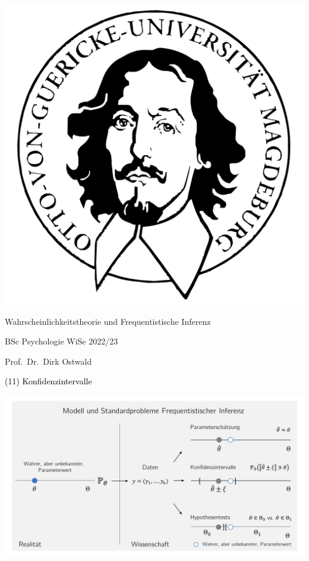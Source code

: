 \documentclass[
  8pt,
  ignorenonframetext,
]{beamer}
\author{}
\date{\vspace{-2.5em}}
\begin{document}
\begin{frame}[plain]{}
\protect\hypertarget{section}{}
\center

\begin{center}\includegraphics[width=0.2\linewidth]{11_Abbildungen/wtfi_11_otto} \end{center}

\vspace{2mm}

\Large

Wahrscheinlichkeitstheorie und Frequentistische Inferenz \vspace{6mm}

\large

BSc Psychologie WiSe 2022/23

\vspace{6mm}
\normalsize

Prof.~Dr.~Dirk Ostwald
\end{frame}

\begin{frame}[plain]{}
\protect\hypertarget{section-1}{}
\vfill
\center
\huge

\textcolor{black}{(11) Konfidenzintervalle} \vfill
\end{frame}

\begin{frame}{}
\protect\hypertarget{section-2}{}
\begin{center}\includegraphics[width=1\linewidth]{11_Abbildungen/wtfi_11_frequentistische_inferenz} \end{center}
\end{frame}
\end{document}
